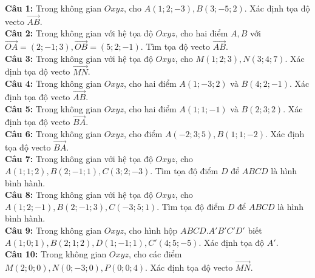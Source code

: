 \documentclass[12pt]{article}
\begin{document}
	\begin{btvang}
		\noindent \textbf{Câu 1:} Trong không gian $Oxyz$, cho $A(1; 2; -3), B(3; -5; 2)$. Xác định tọa độ vecto $\vec{AB}$. \\
		\noindent \textbf{Câu 2:} Trong không gian với hệ tọa độ $Oxyz$, cho hai điểm $A, B$ với $\vec{OA} = (2; -1; 3), \vec{OB} = (5; 2; -1)$. Tìm tọa độ vecto $\vec{AB}$. \\
		\noindent \textbf{Câu 3:} Trong không gian với hệ tọa độ $Oxyz$, cho $M(1; 2; 3), N(3; 4; 7)$. Xác định tọa độ vecto $\vec{MN}$. \\
		\noindent \textbf{Câu 4:} Trong không gian $Oxyz$, cho hai điểm $A(1; -3; 2)$ và $B(4; 2; -1)$. Xác định tọa độ vecto $\vec{AB}$. \\
		\noindent \textbf{Câu 5:} Trong không gian $Oxyz$, cho hai điểm $A(1; 1; -1)$ và $B(2; 3; 2)$. Xác định tọa độ vecto $\vec{BA}$. \\
		\noindent \textbf{Câu 6:} Trong không gian $Oxyz$, cho điểm $A(-2; 3; 5), B(1; 1; -2)$. Xác định tọa độ vecto $\vec{BA}$. \\
		\noindent \textbf{Câu 7:} Trong không gian với hệ tọa độ $Oxyz$, cho $A(1; 1; 2), B(2; -1; 1), C(3; 2; -3)$. Tìm tọa độ điểm $D$ để $ABCD$ là hình bình hành. \\
		\noindent \textbf{Câu 8:} Trong không gian với hệ tọa độ $Oxyz$, cho $A(1; 2; -1), B(2; -1; 3), C(-3; 5; 1)$. Tìm tọa độ điểm $D$ để $ABCD$ là hình bình hành. \\
		\noindent \textbf{Câu 9:} Trong không gian $Oxyz$, cho hình hộp $ABCD.A'B'C'D'$ biết $A(1; 0; 1), B(2; 1; 2), D(1; -1; 1), C'(4; 5; -5)$. Xác định tọa độ $A'$. \\
		\noindent \textbf{Câu 10:} Trong không gian $Oxyz$, cho các điểm $M(2; 0; 0), N(0; -3; 0), P(0; 0; 4)$. Xác định tọa độ vecto $\vec{MN}$.
	\end{btvang}
	
\end{document}
